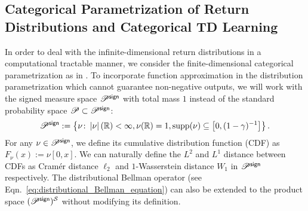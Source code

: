 \subsection{Categorical Parametrization of Return Distributions and Categorical TD Learning}
In order to deal with the infinite-dimensional return distributions in a computational tractable manner, we consider the finite-dimensional categorical parametrization as in \citep{bellemare2017distributional,rowland2018analysis,bellemare2019distributional,rowland2024nearminimaxoptimal,peng2024statistical}.
To incorporate function approximation in the distribution parametrization which cannot guarantee non-negative outputs, we will work with the signed measure space ${\mathscr{P}}^{\mathsf{sign}}$ with total mass $1$ instead of the standard probability space ${\mathscr{P}}\subset {\mathscr{P}}^{\mathsf{sign}}$:
\begin{equation*}
    {\mathscr{P}}^{\mathsf{sign}}:= \left\{\nu\colon\left|{\nu}\right|({\mathbb R})< \infty ,\nu({\mathbb R})=1,\operatorname{supp}(\nu)\subseteq \left[0,(1-\gamma)^{-1}\right] \right\}.
\end{equation*} 
For any $\nu\in{\mathscr{P}}^{\mathsf{sign}}$, we define its cumulative distribution function (CDF) as $F_\nu(x):=\nu[0,x]$. 
We can naturally define the $L^2$ and $L^1$ distance between CDFs as Cram\'er distance $\ell_2$ and $1$-Wasserstein distance $W_1$ in ${\mathscr{P}}^{\mathsf{sign}}$ respectively.
The distributional Bellman operator (see Eqn.~\eqref{eq:distributional_Bellman_equation}) can also be extended to the product space $({\mathscr{P}}^{\mathsf{sign}})^{{\mathcal{S}}}$ without modifying its definition.

